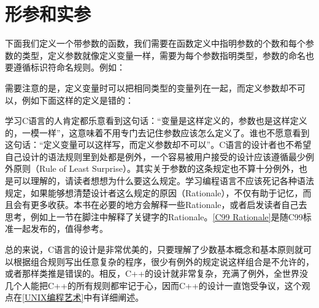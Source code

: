 


\section{形参和实参}
%
下面我们定义一个带参数的函数，我们需要在函数定义中指明参数的个数和每个参数的类型，定义参数就像定义变量一样，需要为每个参数指明类型，参数的命名也要遵循标识符命名规则。例如：





需要注意的是，定义变量时可以把相同类型的变量列在一起，而定义参数却不可以，例如下面这样的定义是错的：




学习C语言的人肯定都乐意看到这句话：“变量是这样定义的，参数也是这样定义的，一模一样”，这意味着不用专门去记住参数应该怎么定义了。谁也不愿意看到这句话：“定义变量可以这样写，而定义参数却不可以”。C语言的设计者也不希望自己设计的语法规则里到处都是例外，一个容易被用户接受的设计应该遵循最少例外原则（Rule of Least Surprise）。其实关于参数的这条规定也不算十分例外，也是可以理解的，请读者想想为什么要这么规定。学习编程语言不应该死记各种语法规定，如果能够想清楚设计者这么规定的原因（Rationale），不仅有助于记忆，而且会有更多收获。本书在必要的地方会解释一些Rationale，或者启发读者自己去思考，例如上一节在脚注中解释了关键字的Rationale。\hyperlink{db.bi01.bibli.rationale}{[C99 Rationale]}是随C99标准一起发布的，值得参考。



总的来说，C语言的设计是非常优美的，只要理解了少数基本概念和基本原则就可以根据组合规则写出任意复杂的程序，很少有例外的规定说这样组合是不允许的，或者那样类推是错误的。相反，C+\BookSplit{}+\BookSplit{}的设计就非常复杂，充满了例外，全世界没几个人能把C+\BookSplit{}+\BookSplit{}的所有规则都牢记于心，因而C+\BookSplit{}+\BookSplit{}的设计一直饱受争议，这个观点在\hyperlink{db.bi01.bibli.taoup}{[UNIX编程艺术]}中有详细阐述。



